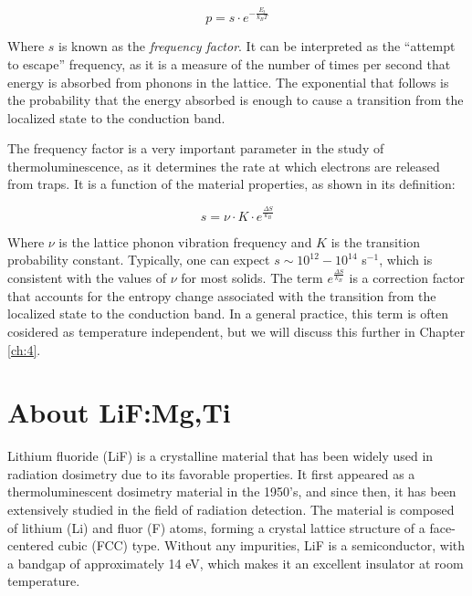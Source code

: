 \begin{equation}
  p = s \cdot e^{-\frac{E_t}{k_B T}}
\end{equation}

\vspace{10pt}
Where $s$ is known as the \textit{frequency factor}. It can be interpreted as the ``attempt to escape'' frequency, as it is a measure of the number of times per second that energy is absorbed from phonons in the lattice. The exponential that follows is the probability that the energy absorbed is enough to cause a transition from the localized state to the conduction band. 

\vspace{10pt}

The frequency factor is a very important parameter in the study of thermoluminescence, as it determines the rate at which electrons are released from traps. It is a function of the material properties, as shown in its definition:

\begin{equation} \label{eq:freqfactor}
  s = \nu \cdot K \cdot e^{\frac{\Delta S}{k_B}}
\end{equation}

\vspace{10pt}
Where $\nu$ is the lattice phonon vibration frequency and $K$ is the transition probability constant. Typically, one can expect $s \sim 10^{12} -10^{14}$ s$^{-1}$, which is consistent with the values of $\nu$ for most solids. The term $e^{\frac{\Delta S}{k_B}}$ is a correction factor that accounts for the entropy change associated with the transition from the localized state to the conduction band. In a general practice, this term is often cosidered as temperature independent, but we will discuss this further in Chapter \ref{ch:4}.


\section{About LiF:Mg,Ti} \label{sec:LiF}


Lithium fluoride (LiF) is a crystalline material that has been widely used in radiation dosimetry due to its favorable %
properties. It first appeared as a thermoluminescent dosimetry material in the 1950's, and since then, it has been extensively studied in the field of radiation detection. The material is composed of lithium (Li) and fluor (F) %
atoms, forming a crystal lattice structure of a face-centered cubic (FCC) type. Without any impurities, LiF is a semiconductor, with a bandgap of approximately 14 eV, which makes it an excellent insulator at room temperature.

